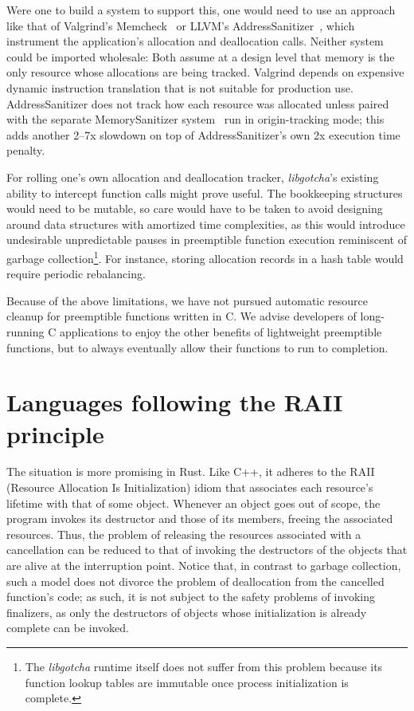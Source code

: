 Were one to build a system to support this, one would need to use an approach like
that of Valgrind's Memcheck~\cite{seward:usenix2005} or LLVM's
AddressSanitizer~\cite{serebryany:usenix2012}, which
instrument the application's allocation and deallocation calls.  Neither system could
be imported wholesale:  Both assume at a design level that memory is the only
resource whose allocations are being tracked.  Valgrind depends on expensive dynamic
instruction translation that is not suitable for production use.  AddressSanitizer
does not track how each resource was allocated unless paired with the separate
MemorySanitizer system~\cite{stepanov:cgo2015} run in origin-tracking mode; this adds
another 2--7x slowdown on top of AddressSanitizer's own 2x execution time penalty.

For rolling one's own allocation and deallocation tracker, \textit{libgotcha}'s
existing ability to intercept function calls might prove useful.  The bookkeeping
structures would need to be mutable, so care would have to be taken to avoid
designing around data structures with
amortized time complexities, as this would introduce undesirable unpredictable pauses
in preemptible function execution reminiscent of garbage collection\footnote{The
\textit{libgotcha} runtime itself does not suffer from this problem because its
function lookup tables are immutable once process initialization is complete.}.  For
instance, storing allocation records in a hash table would require periodic
rebalancing.

Because of the above limitations, we have not pursued automatic resource cleanup for
preemptible functions written in C.  We advise developers of long-running C
applications to enjoy the other benefits of lightweight preemptible functions, but to
always eventually allow their functions to run to completion.


\section{Languages following the RAII principle}

The situation is more promising in Rust.  Like C++, it adheres to the RAII (Resource
Allocation Is Initialization) idiom that associates each resource's lifetime with
that of some object.  Whenever an object goes out of scope, the program invokes its
destructor and those of its members, freeing the associated resources.  Thus, the
problem of releasing the resources associated with a cancellation can be reduced to
that of invoking the destructors of the objects that are alive at the interruption
point.  Notice that, in contrast to garbage collection, such a model does not divorce
the problem of deallocation from the cancelled function's code; as such, it is not
subject to the safety problems of invoking finalizers, as only the destructors of
objects whose initialization is already complete can be invoked.

